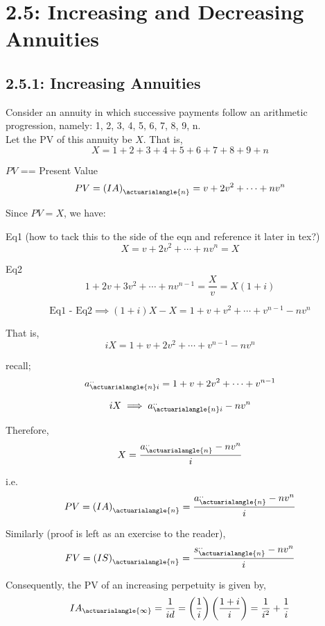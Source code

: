 \documentclass[12pt]{article}
\begin{document}
\pagebreak

\section{2.5: Increasing and Decreasing Annuities} 
\subsection{2.5.1: Increasing Annuities}
Consider an annuity in which successive payments follow an arithmetic progression, 
namely: 1, 2, 3, 4, 5, 6, 7, 8, 9, n.\\

Let the PV of this annuity be $X$. That is,
$$
X = 1 + 2 + 3 + 4 + 5 + 6 + 7 + 8 + 9 + n
$$

$PV$ == Present Value
$$
PV = \left(IA \right)_{\actuarialangle{n}} = v + 2v^2 + \cdots + nv^n
$$

Since $PV = X$, we have:

Eq1 (how to tack this to the side of the eqn and reference it later in tex?)
$$
X = v + 2v^2 + \cdots + nv^n = X
$$ 

Eq2
$$
1 + 2v + 3v^2 + \cdots + nv^{n-1} = \frac{X}{v} = X \left(1+i\right)
$$

$$
\text{Eq1 - Eq2} \implies \left(1+i \right)X-X = 1 + v + v^2 + \cdots + v^{n-1} - nv^n
$$

That is,
$$
iX = 1 + v + 2v^2 + \cdots + v^{n-1} - nv^n
$$

recall;
$$
a^{..}_{\actuarialangle{n}i} =  1 + v + 2v^2 + \cdots + v^{n-1}
$$

$$
iX \implies a^{..}_{\actuarialangle{n}i} - nv^n
$$

Therefore,
$$ 
X = \frac{a^{..}_{\actuarialangle{n}}- nv^n}{i}
$$

i.e.
$$
PV =  \left(IA \right)_{\actuarialangle{n}} = \frac{a^{..}_{\actuarialangle{n}}- nv^n}{i}
$$

Similarly (proof is left as an exercise to the reader),
$$
FV = \left(IS \right)_{\actuarialangle{n}} = \frac{s^{..}_{\actuarialangle{n}}- nv^n}{i}
$$

Consequently, the PV of an increasing perpetuity is given by,
$$
IA_{\actuarialangle{\infty}} = \frac{1}{id} = \left(\frac{1}{i} \right) \left(\frac{1+i}{i}\right) = \frac{1}{i^2} + \frac{1}{i}
$$

 
 
\end{document}

